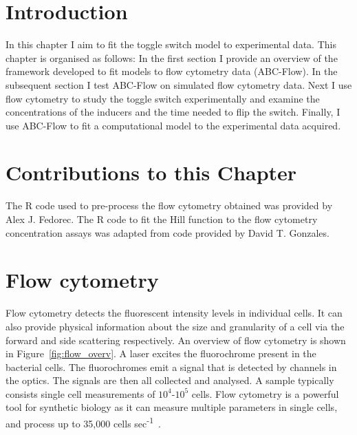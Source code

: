 \section{Introduction}

In this chapter I aim to fit the toggle switch model to experimental data. This chapter is organised as follows: In the first section I provide an overview of the framework developed to fit models to flow cytometry data (ABC-Flow). In the subsequent section I test ABC-Flow on simulated flow cytometry data. Next I use flow cytometry to study the toggle switch experimentally and examine the concentrations of the inducers and the time needed to flip the switch. Finally, I use ABC-Flow to fit a computational model to the experimental data acquired.


\section{Contributions to this Chapter}

The R code used to pre-process the flow cytometry obtained was provided by Alex J. Fedorec. The R code to fit the Hill function to the flow cytometry concentration assays was adapted from code provided by David T. Gonzales. 

\section{Flow cytometry}
Flow cytometry detects the fluorescent intensity levels in individual cells. It can also provide physical information about the size and granularity of a cell via the forward and side scattering respectively. An overview of flow cytometry is shown in Figure~\ref{fig:flow_overv}. A laser excites the fluorochrome present in the bacterial cells. The fluorochromes emit a signal that is detected by channels in the optics. The signals are then all collected and analysed. A sample typically consists single cell measurements of $10^4$-$10^5$ cells. %
Flow cytometry is a powerful tool for synthetic biology as it can measure multiple parameters in single cells, and process up to 35,000 cells sec\textsuperscript{-1}~\autocite{Anonymous:2015tj}. 


